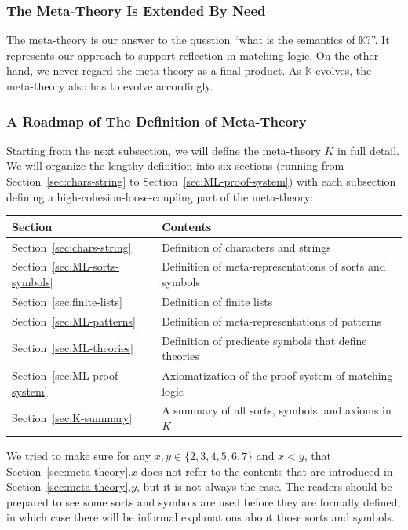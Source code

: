 \documentclass[UTF8,11pt]{article}
\theoremstyle{plain}
\theoremstyle{definition}
\theoremstyle{remark}
\newcommand{\K}{\mbox{$\mathbb{K}$}\xspace}
\begin{document}
\subsubsection{The Meta-Theory Is Extended By Need}
The meta-theory is our answer to the question ``what is the semantics of \K?''.
It represents our approach to support reflection in matching logic.
On the other hand, we never regard the meta-theory as a final product. 
As \K evolves, the meta-theory also has to evolve accordingly.


\subsubsection{A Roadmap of The Definition of Meta-Theory}
Starting from the next subsection, we will define the meta-theory $K$ in full 
detail.
We will organize the lengthy definition into six sections (running from 
Section~\ref{sec:chars-string} to Section~\ref{sec:ML-proof-system})
with each subsection defining a high-cohesion-loose-coupling part of the 
meta-theory:
\begin{center}
\begin{tabular}{l|l}
	\textbf{Section} & \textbf{Contents}
	\\\hline\hline
	Section~\ref{sec:chars-string} & Definition of characters and strings
	\\\hline
	Section~\ref{sec:ML-sorts-symbols} & Definition of meta-representations 
	of sorts and symbols
	\\\hline
	Section~\ref{sec:finite-lists} & Definition of finite lists
	\\\hline
	Section~\ref{sec:ML-patterns} & Definition of meta-representations of 
	patterns
	\\\hline
	Section~\ref{sec:ML-theories} & Definition of predicate symbols that
	define theories
	\\\hline
	Section~\ref{sec:ML-proof-system} & Axiomatization of the proof system of 
	matching logic
	\\\hline
	Section~\ref{sec:K-summary} & A summary of all sorts, symbols, and axioms 
	in $K$
\end{tabular}
\end{center}

We tried to make sure for any $x, y \in \{2,3,4,5,6,7\}$ and $x < y$, that 
Section~\ref{sec:meta-theory}.$x$ does not refer to the contents that are 
introduced in Section~\ref{sec:meta-theory}.$y$, but it is not always the case.
The readers should be prepared to see some sorts and symbols are used before 
they are formally defined, in which case there will be informal explanations 
about those sorts and symbols.
\end{document}
